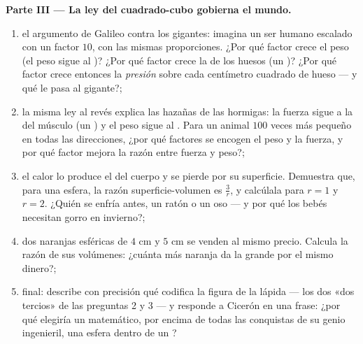 \begin{problem}
\medskip
\noindent\textbf{Parte III --- La ley del cuadrado-cubo gobierna el
mundo.}
\begin{enumerate}[resume]
  \item el argumento de Galileo contra los gigantes: imagina un ser humano
        escalado con un factor $10$, con las mismas proporciones. ¿Por qué
        factor crece el peso (el peso sigue al )? ¿Por qué
        factor crece la  de los huesos
        (un )? ¿Por qué factor crece entonces la \emph{presión}
        sobre cada centímetro cuadrado de hueso --- y qué le
        pasa al gigante?;
  \item la misma ley al revés explica las hazañas de las hormigas: la fuerza
        sigue a la  del músculo (un ) y el peso sigue al
        . Para un animal $100$ veces más pequeño en todas las
        direcciones, ¿por qué factores se encogen el peso y la fuerza,
        y por qué factor mejora la razón entre fuerza
        y peso?;
  \item el calor lo produce el  del cuerpo y se pierde por
        su superficie. Demuestra que, para una esfera, la
        razón superficie-volumen es $\frac{3}{r}$, y calcúlala
        para $r = 1$ y $r = 2$. ¿Quién se enfría antes, un ratón o
        un oso --- y por qué los bebés necesitan gorro en invierno?;
  \item dos naranjas esféricas de  $4$ cm y $5$ cm se
        venden al mismo precio. Calcula la razón de sus
        volúmenes: ¿cuánta más naranja da la grande por
        el mismo dinero?;
  \item final: describe con precisión qué codifica la figura de la lápida
        --- los dos «dos tercios» de las preguntas 2 y 3
        --- y responde a Cicerón en una frase: ¿por qué elegiría un
        matemático, por encima de todas las conquistas de su
        genio ingenieril, una esfera dentro de un ?
\end{enumerate}
\end{problem}
